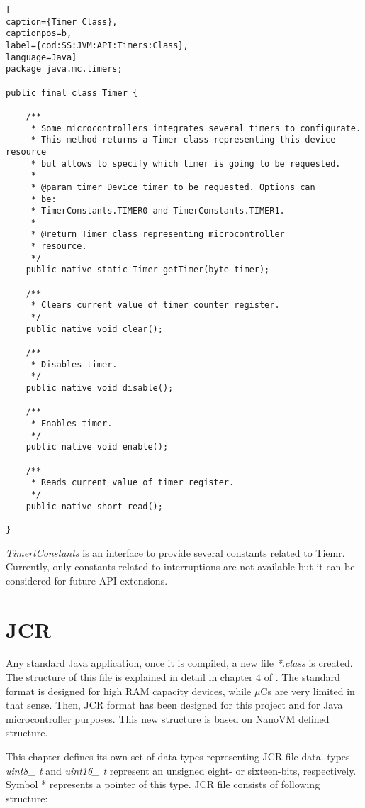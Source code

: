 \medskip
\begin{lstlisting}[
caption={Timer Class},
captionpos=b,
label={cod:SS:JVM:API:Timers:Class},
language=Java]
package java.mc.timers;

public final class Timer {

    /**
     * Some microcontrollers integrates several timers to configurate.
     * This method returns a Timer class representing this device resource
     * but allows to specify which timer is going to be requested.
     *
     * @param timer Device timer to be requested. Options can
     * be:
     * TimerConstants.TIMER0 and TimerConstants.TIMER1.
     *
     * @return Timer class representing microcontroller
     * resource.
     */
    public native static Timer getTimer(byte timer);

    /**
     * Clears current value of timer counter register.
     */
    public native void clear();

    /**
     * Disables timer.
     */
    public native void disable();

    /**
     * Enables timer.
     */
    public native void enable();

    /**
     * Reads current value of timer register.
     */
    public native short read();

}
\end{lstlisting}
\medskip

\textit{TimertConstants} is an interface to provide several constants related to Tiemr. Currently, only constants related to interruptions are not available but it can be considered for future API extensions.

\section{JCR}\label{S:JVM:JCR}
Any standard Java application, once it is compiled, a new file \textit{*.class} is created. The structure of this file is explained in detail in chapter 4 of \cite{Art:JVMSE7}. The standard format is designed for high RAM capacity devices, while $\mu$Cs are very limited in that sense. Then, JCR format has been designed for this project and for Java microcontroller purposes. This new structure is based on NanoVM \cite{Art:NanoVM} defined structure.

This chapter defines its own set of data types representing JCR file data. types \textit{uint8\_ t} and \textit{uint16\_ t} represent an unsigned eight- or sixteen-bits, respectively. Symbol * represents a pointer of this type. JCR file consists of following structure:

